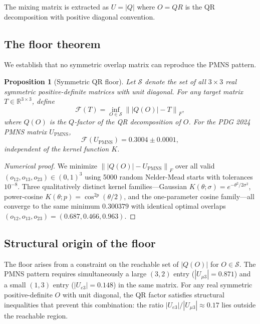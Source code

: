 \documentclass[floatfix,aps,prd,twocolumn,showpacs,superscriptaddress,longbibliography]{revtex4-2}
\newtheorem{proposition}{Proposition}
\newcommand{\frob}[1]{\left\|#1\right\|_F}
\begin{document}
The mixing matrix is extracted as $U = |Q|$ where $O = QR$ is the QR
decomposition with positive diagonal convention.

\subsection{The floor theorem}

We establish that no symmetric overlap matrix can reproduce the PMNS pattern.

\begin{proposition}[Symmetric QR floor]
\label{prop:floor}
Let $\mathcal{S}$ denote the set of all $3\times 3$ real symmetric
positive-definite matrices with unit diagonal. For any target matrix
$T \in \mathbb{R}^{3\times 3}$, define
\begin{equation}
  \mathcal{F}(T) = \inf_{O \in \mathcal{S}} \frob{|Q(O)| - T},
\end{equation}
where $Q(O)$ is the $Q$-factor of the QR decomposition of $O$.
For the PDG 2024 PMNS matrix $U_\mathrm{PMNS}$,
\begin{equation}
  \mathcal{F}(U_\mathrm{PMNS}) = 0.3004 \pm 0.0001,
\end{equation}
independent of the kernel function $K$.
\end{proposition}

\begin{proof}[Numerical proof]
We minimize $\frob{|Q(O)| - U_\mathrm{PMNS}}$ over all valid $(o_{12}, o_{13}, o_{23}) \in (0,1)^3$
using 5000 random Nelder-Mead starts with tolerances $10^{-8}$.
Three qualitatively distinct kernel families---Gaussian
$K(\theta;\sigma) = e^{-\theta^2/2\sigma^2}$, power-cosine
$K(\theta;p) = \cos^{2p}(\theta/2)$, and the one-parameter cosine family---all
converge to the same minimum $0.300379$ with identical optimal overlaps
$(o_{12}, o_{13}, o_{23}) = (0.687, 0.466, 0.963)$.
\end{proof}

\subsection{Structural origin of the floor}

The floor arises from a constraint on the reachable set of $|Q(O)|$ for
$O \in \mathcal{S}$. The PMNS pattern requires simultaneously a large
$(3,2)$ entry ($|U_{\mu 3}| = 0.871$) and a small $(1,3)$ entry
($|U_{e3}| = 0.148$) in the same matrix. For any real symmetric
positive-definite $O$ with unit diagonal, the QR factor satisfies
structural inequalities that prevent this combination: the ratio
$|U_{e3}|/|U_{\mu 3}| \approx 0.17$ lies outside the reachable region.
\end{document}
